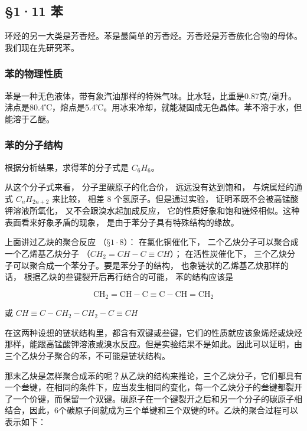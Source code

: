 \subsection{§1·11 苯}

环烃的另一大类是芳香烃。苯是最简单的芳香烃。芳香烃是芳香族化合物的母体。我们现在先研究苯。

\subsubsection{苯的物理性质}

苯是一种无色液体，带有象汽油那样的特殊气味。比水轻，比重是0.87克/毫升。沸点是80.4℃，熔点是5.4℃。用冰来冷却，就能凝固成无色晶体。苯不溶于水，但能溶于乙醚。

\subsubsection{苯的分子结构}

根据分析结果，求得苯的分子式是 \(C_{6}H_{6}\)。

从这个分子式来看， 分子里碳原子的化合价， 远远没有达到饱和，
与烷属烃的通式 \(C_{n}H_{2n+2}\) 来比较， 相差 8
个氢原子。但是通过实验， 证明苯既不会被高锰酸钾溶液所氧化，
又不会跟溴水起加成反应，
它的性质好象和饱和链烃相似。这种表面看来好象矛盾的现象，
是由于苯分子具有特殊结构的缘故。

上面讲过乙炔的聚合反应 （\(§1\cdot8\)）： 在氯化铜催化下，
二个乙炔分子可以聚合成一个乙烯基乙炔分子 （\(CH_{2}=CH-C\equiv CH\)）；
在活性炭催化下， 三个乙炔分子可以聚合成一个苯分子。要是苯分子的结构，
也象链状的乙烯基乙炔那样的话， 根据乙炔的叁键裂开后再行结合的可能，
苯的结构应该是

\[
\mathrm{CH}_{2}=\mathrm{CH}-\mathrm{C}\equiv\mathrm{C}-\mathrm{CH}=\mathrm{CH}_{2}
\]

或 \(CH \equiv C-CH_{2}-CH_{2}-C \equiv CH\)

在这两种设想的链状结构里，都含有双键或叁键，它们的性质就应该象烯烃或炔烃那样，能跟高锰酸钾溶液或溴水反应。但是实验结果不是如此。因此可以证明，由三个乙炔分子聚合的苯，不可能是链状结构。

那末乙炔是怎样聚合成苯的呢？从乙炔的结构来推论，三个乙炔分子，它们都具有一个叁键，在相同的条件下，应当发生相同的变化，每一个乙炔分子的叁键都裂开了一个价键，而保留一个双键。碳原子在一个键裂开之后和另一个分子的碳原子相结合，因此，6个碳原子间就成为三个单键和三个双键的环。乙炔的聚合过程可以表示如下：

